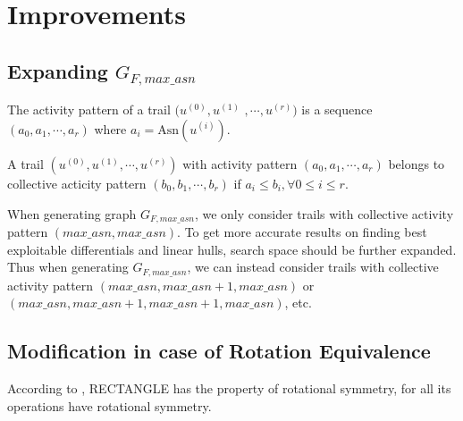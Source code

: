 


\section{Improvements}\label{sec:improvements}

\subsection{Expanding $G_{F,max\_asn}$}

\begin{definition}
	The activity pattern of a trail $(u^{(0)},u^{(1)}$ $,\cdots,u^{(r)})$ is a sequence $(a_0,a_1,\cdots,a_r)$ where $a_i=\text{Asn}(u^{(i)})$. 
\end{definition}

\begin{definition}
	A trail $(u^{(0)},u^{(1)},\cdots,u^{(r)})$ with activity pattern $(a_0,a_1,\cdots,a_r)$ belongs to collective acticity pattern $(b_0,b_1,\cdots,b_r)$ if $a_i\leq b_i,\forall 0\leq i\le r$. 
\end{definition}

When generating graph $G_{F,max\_asn}$, we only consider trails with collective activity pattern $(max\_asn,max\_asn)$. To get more accurate results on finding best exploitable differentials and linear hulls, search space should be further expanded. Thus when generating $G_{F,max\_asn}$, we can instead consider trails with collective activity pattern $(max\_asn, max\_asn+1, max\_asn)$ or $(max\_asn, max\_asn+1, max\_asn+1, max\_asn)$, etc.

\subsection{Modification in case of Rotation Equivalence}

According to \cite{ZBL15}, RECTANGLE has the property of rotational symmetry, for all its operations have rotational symmetry. 

